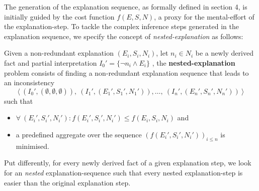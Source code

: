 

The generation of the explanation sequence, as formally defined in section 4, is initially guided by the cost function $f(E, S, N)$, a proxy for the mental-effort of the explanation-step. To tackle the complex inference steps generated in the explanation sequence, we specify the concept of \emph{nested-explanation} as follows:

\begin{definition}
    Given a non-redundant explanation $(E_i, S_i, N_i)$, let $n_i \in N_i$ be a newly derived fact and partial interpretation  $I_0' = \{ \neg n_i \wedge E_i \}$ , the \textbf{nested-explanation} problem consists of finding a non-redundant explanation sequence that leads to an inconsistency
    \[\langle \ (I_0',(\emptyset,\emptyset,\emptyset)),\ (I_1',(E_1',S_1',N_1')), \dots ,\ (I_n',(E_n',S_n',N_n')) \ \rangle\]
    such that
    \begin{itemize}
        \item $\forall \ (E_i',S_i',N_i') : f(E_i',S_i',N_i') \leq f(E_i, S_i, N_i)$ and
        \item a predefined aggregate over the sequence $\left(f(E_i',S_i',N_i')\right)_{i\leq n}$ is minimised.
    \end{itemize}
\end{definition}

Put differently, for every newly derived fact of a given explanation step, we look for an \emph{nested} explanation-sequence such that every nested explanation-step is easier than the original explanation step.




